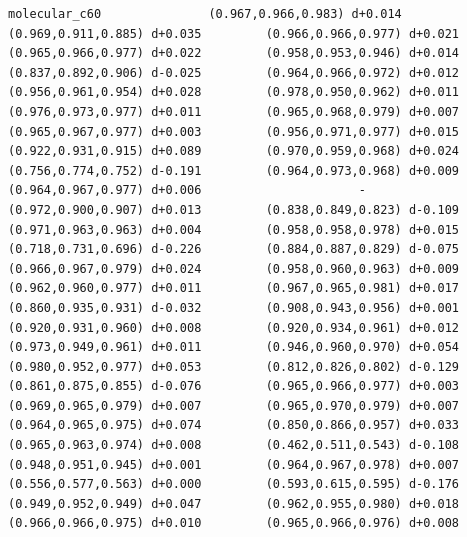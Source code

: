 \documentclass[11pt, letterpaper, openany]{book}
\begin{document}
\begin{empiricalbox}
\begin{lstlisting}[style=terminal]
molecular_c60               (0.967,0.966,0.983) d+0.014         (0.969,0.911,0.885) d+0.035         (0.966,0.966,0.977) d+0.021         (0.965,0.966,0.977) d+0.022         (0.958,0.953,0.946) d+0.014         (0.837,0.892,0.906) d-0.025         (0.964,0.966,0.972) d+0.012         (0.956,0.961,0.954) d+0.028         (0.978,0.950,0.962) d+0.011         (0.976,0.973,0.977) d+0.011         (0.965,0.968,0.979) d+0.007         (0.965,0.967,0.977) d+0.003         (0.956,0.971,0.977) d+0.015         (0.922,0.931,0.915) d+0.089         (0.970,0.959,0.968) d+0.024         (0.756,0.774,0.752) d-0.191         (0.964,0.973,0.968) d+0.009         (0.964,0.967,0.977) d+0.006                      -                      (0.972,0.900,0.907) d+0.013         (0.838,0.849,0.823) d-0.109         (0.971,0.963,0.963) d+0.004         (0.958,0.958,0.978) d+0.015         (0.718,0.731,0.696) d-0.226         (0.884,0.887,0.829) d-0.075         (0.966,0.967,0.979) d+0.024         (0.958,0.960,0.963) d+0.009         (0.962,0.960,0.977) d+0.011         (0.967,0.965,0.981) d+0.017         (0.860,0.935,0.931) d-0.032         (0.908,0.943,0.956) d+0.001         (0.920,0.931,0.960) d+0.008         (0.920,0.934,0.961) d+0.012         (0.973,0.949,0.961) d+0.011         (0.946,0.960,0.970) d+0.054         (0.980,0.952,0.977) d+0.053         (0.812,0.826,0.802) d-0.129         (0.861,0.875,0.855) d-0.076         (0.965,0.966,0.977) d+0.003         (0.969,0.965,0.979) d+0.007         (0.965,0.970,0.979) d+0.007         (0.964,0.965,0.975) d+0.074         (0.850,0.866,0.957) d+0.033         (0.965,0.963,0.974) d+0.008         (0.462,0.511,0.543) d-0.108         (0.948,0.951,0.945) d+0.001         (0.964,0.967,0.978) d+0.007         (0.556,0.577,0.563) d+0.000         (0.593,0.615,0.595) d-0.176         (0.949,0.952,0.949) d+0.047         (0.962,0.955,0.980) d+0.018         (0.966,0.966,0.975) d+0.010         (0.965,0.966,0.976) d+0.008     

\end{lstlisting}
\end{empiricalbox}
\end{document}
